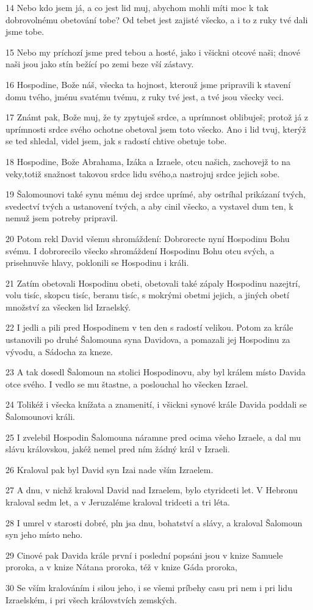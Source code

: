 \par 14 Nebo kdo jsem já, a co jest lid muj, abychom mohli míti moc k tak dobrovolnému obetování tobe? Od tebet jest zajisté všecko, a i to z ruky tvé dali jsme tobe.
\par 15 Nebo my príchozí jsme pred tebou a hosté, jako i všickni otcové naši; dnové naši jsou jako stín bežící po zemi beze vší zástavy.
\par 16 Hospodine, Bože náš, všecka ta hojnost, kterouž jsme pripravili k stavení domu tvého, jménu svatému tvému, z ruky tvé jest, a tvé jsou všecky veci.
\par 17 Známt pak, Bože muj, že ty zpytuješ srdce, a uprímnost oblibuješ; protož já z uprímnosti srdce svého ochotne obetoval jsem toto všecko. Ano i lid tvuj, kterýž se ted shledal, videl jsem, jak s radostí chtive obetuje tobe.
\par 18 Hospodine, Bože Abrahama, Izáka a Izraele, otcu našich, zachovejž to na veky,totiž snažnost takovou srdce lidu svého,a nastrojuj srdce jejich sobe.
\par 19 Šalomounovi také synu mému dej srdce uprímé, aby ostríhal prikázaní tvých, svedectví tvých a ustanovení tvých, a aby cinil všecko, a vystavel dum ten, k nemuž jsem potreby pripravil.
\par 20 Potom rekl David všemu shromáždení: Dobrorecte nyní Hospodinu Bohu svému. I dobrorecilo všecko shromáždení Hospodinu Bohu otcu svých, a prisehnuvše hlavy, poklonili se Hospodinu i králi.
\par 21 Zatím obetovali Hospodinu obeti, obetovali také zápaly Hospodinu nazejtrí, volu tisíc, skopcu tisíc, beranu tisíc, s mokrými obetmi jejich, a jiných obetí množství za všecken lid Izraelský.
\par 22 I jedli a pili pred Hospodinem v ten den s radostí velikou. Potom za krále ustanovili po druhé Šalomouna syna Davidova, a pomazali jej Hospodinu za vývodu, a Sádocha za kneze.
\par 23 A tak dosedl Šalomoun na stolici Hospodinovu, aby byl králem místo Davida otce svého. I vedlo se mu štastne, a poslouchal ho všecken Izrael.
\par 24 Tolikéž i všecka knížata a znamenití, i všickni synové krále Davida poddali se Šalomounovi králi.
\par 25 I zvelebil Hospodin Šalomouna náramne pred ocima všeho Izraele, a dal mu slávu královskou, jakéž nemel pred ním žádný král v Izraeli.
\par 26 Kraloval pak byl David syn Izai nade vším Izraelem.
\par 27 A dnu, v nichž kraloval David nad Izraelem, bylo ctyridceti let. V Hebronu kraloval sedm let, a v Jeruzaléme kraloval tridceti a tri léta.
\par 28 I umrel v starosti dobré, pln jsa dnu, bohatství a slávy, a kraloval Šalomoun syn jeho místo neho.
\par 29 Cinové pak Davida krále první i poslední popsáni jsou v knize Samuele proroka, a v knize Nátana proroka, též v knize Gáda proroka,
\par 30 Se vším kralováním i silou jeho, i se všemi príbehy casu pri nem i pri lidu Izraelském, i pri všech královstvích zemských.

